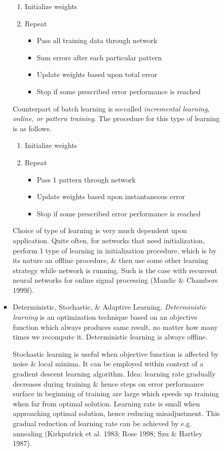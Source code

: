 \documentclass{article}
\begin{document}
\begin{enumerate}
\begin{itemize}
\begin{itemize}
\begin{itemize}
				\begin{enumerate}
					\item Initialize weights
					\item Repeat
					\begin{itemize}
						\item Pass all training data through network
						\item Sum errors after each particular pattern
						\item Update weights based upon total error
						\item Stop if some prescribed error performance is reached
					\end{itemize}					
				\end{enumerate}
				Counterpart of batch learning is so-called {\it incremental learning, online, or pattern training}. The procedure for this type of learning is as follows.
				\begin{enumerate}
					\item Initialize weights
					\item Repeat
					\begin{itemize}
						\item Pass 1 pattern through network
						\item Update weights based upon instantaneous error
						\item Stop if some prescribed error performance is reached
					\end{itemize}
				\end{enumerate}
				Choice of type of learning is very much dependent upon application. Quite often, for networks that need initialization, perform 1 type of learning in initialization procedure, which is by its nature an offline procedure, \& then use some other learning strategy while network is running. Such is the case with recurrent neural networks for online signal processing (Mandic \& Chambers 1999f).
				\item {\sf Deterministic, Stochastic, \& Adaptive Learning.} {\it Deterministic learning} is an optimization technique based on an objective function which always produces same result, no matter how many times we recompute it. Deterministic learning is always offline.
				
				Stochastic learning is useful when objective function is affected by noise \& local minima. It can be employed within context of a gradient descent learning algorithm. Idea: learning rate gradually decreases during training \& hence steps on error performance surface in beginning of training are large which speeds up training when far from optimal solution. Learning rate is small when approaching optimal solution, hence reducing misadjustment. This gradual reduction of learning rate can be achieved by e.g. annealing (Kirkpatrick et al. 1983; Rose 1998; Szu \& Hartley 1987).
				

\end{itemize}
\end{itemize}
\end{itemize}
\end{enumerate}
\end{document}
